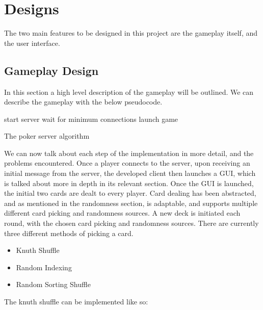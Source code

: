 \section{Designs}
The two main features to be designed in this project are the gameplay itself,
and the user interface.

\subsection{Gameplay Design}
In this section a high level description of the gameplay will be outlined.
We can describe the gameplay with the below pseudocode.

\vspace{0.3cm}

\begin{algorithm}[H]
    start server\;
    wait for minimum connections\;
    launch game\;
\caption{The poker server algorithm}%
\label{code:pokerServer}
\end{algorithm}

\vspace{0.3cm}

We can now talk about each step of the implementation in more detail, and the
problems encountered. Once a player connects to the server, upon receiving
an initial message from the server, the developed client then launches
a GUI, which is talked about more in depth in its relevant section. Once the
GUI is launched, the initial two cards are dealt to every player. Card dealing 
has been abstracted, and as mentioned in the randomness section, is adaptable, 
and supports multiple different card picking and randomness sources. A new deck
is initiated each round, with the chosen card picking and randomness sources. 
There are currently three different methods of picking a card.

\begin{itemize}
    \item Knuth Shuffle
    \item Random Indexing
    \item Random Sorting Shuffle
\end{itemize}

The knuth shuffle \parencite{knuth1997} can be implemented like so:

